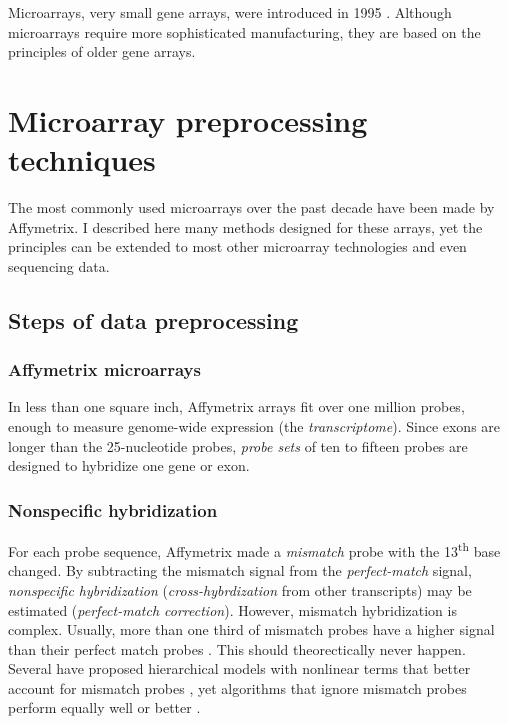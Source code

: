 Microarrays, very small gene arrays, were introduced in 1995 \cite{Schena:1995fy}. 
Although microarrays require more sophisticated
manufacturing, they are based on the principles of older gene arrays.


\section[Microarray preprocessing]{Microarray preprocessing techniques}

The most commonly used microarrays over the past decade
have been made by Affymetrix. I described here many methods
designed for these arrays, yet the principles can be extended to
most other microarray technologies and even sequencing data.

\subsection{Steps of data preprocessing}

\subsubsection{Affymetrix microarrays}

In less than one square inch, Affymetrix arrays fit over one million probes, enough
to measure genome-wide expression (the \textit{transcriptome}).
Since exons are longer than the 25-nucleotide probes,
\textit{probe sets} of ten to fifteen probes are designed to hybridize
one gene or exon.

\subsubsection{Nonspecific hybridization}

For each probe sequence, Affymetrix made a
\textit{mismatch} probe with the 13\textsuperscript{th} 
base changed. 
By subtracting the mismatch signal from the \textit{perfect-match} signal,
\textit{nonspecific hybridization} (\textit{cross-hybrdization} 
from other transcripts) may be 
estimated (\textit{perfect-match correction}).
However, mismatch hybridization is complex.
Usually, more than one third of mismatch probes have a higher
signal than their perfect match probes \cite{Irizarry:2003ge}. 
This should theorectically never happen. Several have proposed
hierarchical models with nonlinear terms that
better account for mismatch probes 
\cite{Li:2001jv,Milo:2003tt,Liu:2005ey,Hein:2005ip}, yet algorithms
that ignore mismatch probes perform equally
well or better \cite{Chen:2007cr,Irizarry:2003ge,Hochreiter:2006ja}.

